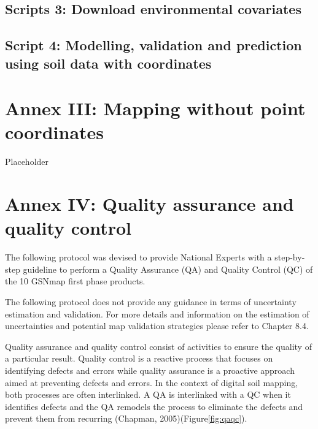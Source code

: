 \documentclass[
  10pt,
  b5paper,
  oneside]{book}
\begin{document}
\hypertarget{scripts-3-download-environmental-covariates}{%
\section*{Scripts 3: Download environmental covariates}\label{scripts-3-download-environmental-covariates}}

\hypertarget{script-4-modelling-validation-and-prediction-using-soil-data-with-coordinates}{%
\section*{Script 4: Modelling, validation and prediction using soil data with coordinates}\label{script-4-modelling-validation-and-prediction-using-soil-data-with-coordinates}}

\hypertarget{annex-iii-mapping-without-point-coordinates}{%
\chapter*{Annex III: Mapping without point coordinates}\label{annex-iii-mapping-without-point-coordinates}}

Placeholder

\hypertarget{annex-iv-quality-assurance-and-quality-control}{%
\chapter*{Annex IV: Quality assurance and quality control}\label{annex-iv-quality-assurance-and-quality-control}}

The following protocol was devised to provide National Experts with a step-by-step guideline to perform a Quality Assurance (QA) and Quality Control (QC) of the 10 GSNmap first phase products.

The following protocol does not provide any guidance in terms of uncertainty estimation and validation. For more details and information on the estimation of uncertainties and potential map validation strategies please refer to Chapter 8.4.

Quality assurance and quality control consist of activities to ensure the quality of a particular result. Quality control is a reactive process that focuses on identifying defects and errors while quality assurance is a proactive approach aimed at preventing defects and errors. In the context of digital soil mapping, both processes are often interlinked. A QA is interlinked with a QC when it identifies defects and the QA remodels the process to eliminate the defects and prevent them from recurring (Chapman, 2005)(Figure\ref{fig:qaqc}).
\end{document}
